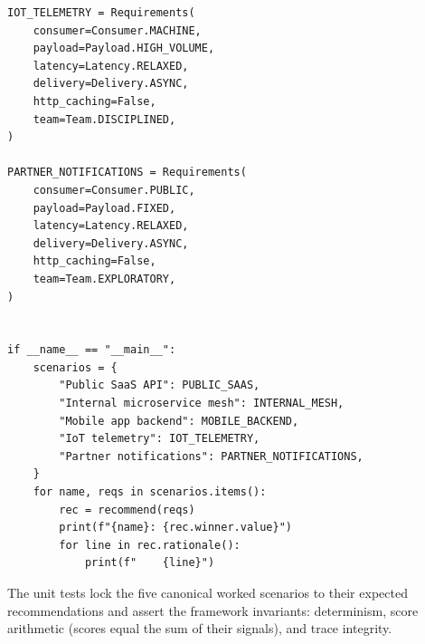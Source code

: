 \begin{verbatim}
IOT_TELEMETRY = Requirements(
    consumer=Consumer.MACHINE,
    payload=Payload.HIGH_VOLUME,
    latency=Latency.RELAXED,
    delivery=Delivery.ASYNC,
    http_caching=False,
    team=Team.DISCIPLINED,
)

PARTNER_NOTIFICATIONS = Requirements(
    consumer=Consumer.PUBLIC,
    payload=Payload.FIXED,
    latency=Latency.RELAXED,
    delivery=Delivery.ASYNC,
    http_caching=False,
    team=Team.EXPLORATORY,
)


if __name__ == "__main__":
    scenarios = {
        "Public SaaS API": PUBLIC_SAAS,
        "Internal microservice mesh": INTERNAL_MESH,
        "Mobile app backend": MOBILE_BACKEND,
        "IoT telemetry": IOT_TELEMETRY,
        "Partner notifications": PARTNER_NOTIFICATIONS,
    }
    for name, reqs in scenarios.items():
        rec = recommend(reqs)
        print(f"{name}: {rec.winner.value}")
        for line in rec.rationale():
            print(f"    {line}")
\end{verbatim}

The unit tests lock the five canonical worked scenarios to their expected
recommendations and assert the framework invariants: determinism, score
arithmetic (scores equal the sum of their signals), and trace integrity.

